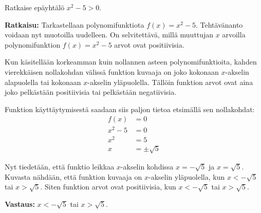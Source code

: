 \begin{esimerkki}
Ratkaise epäyhtälö $x^2-5>0$.

\textbf{Ratkaisu:}
Tarkastellaan polynomifunktiota $f(x)=x^2-5$. Tehtävänanto voidaan nyt muotoilla uudelleen. On selvitettävä, millä muuttujan $x$ arvoilla polynomifunktion $f(x)=x^2-5$ arvot ovat positiivisia.

\begin{kuvaajapohja}[\kuvaajaAsetusEiRuudukkoa\kuvaajaAsetusEiLukuja]{0.6}{-5}{5}{-6}{5}
\end{kuvaajapohja}


Kun käsitellään korkeamman kuin nollannen asteen polynomifunktioita, kahden vierekkäisen nollakohdan välissä funktion kuvaaja on joko kokonaan $x$-akselin alapuolella tai kokonaan $x$-akselin yläpuolella. Tällöin funktion arvot ovat aina joko pelkästään positiivisia tai pelkästään negatiivisia.

Funktion käyttäytymisestä saadaan siis paljon tietoa etsimällä sen nollakohdat:
\begin{align*}
f(x)&=0 \\
x^2-5&=0 \\
x^2&=5 \\
x&=\pm \sqrt{5}
\end{align*}

Nyt tiedetään, että funktio leikkaa $x$-akselin kohdissa $x=-\sqrt{5}$ ja $x=\sqrt{5}$. Kuvasta nähdään, että funktion kuvaaja on $x$-akselin yläpuolella, kun $x<-\sqrt{5}$ tai $x>\sqrt{5}$. Siten funktion arvot ovat positiivisia, kun $x<-\sqrt{5}$ tai $x>\sqrt{5}$.

\begin{lukusuora}{-2.5}{2.5}{5}
\end{lukusuora}

\textbf{Vastaus:} $x<-\sqrt{5}$ tai $x>\sqrt{5}$.

\end{esimerkki}

